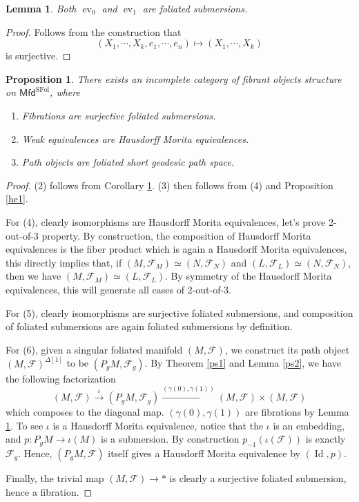 \documentclass[12pt]{amsart}
\newtheorem{lem}[thm]{Lemma}
\newtheorem{prop}[thm]{Proposition}
\theoremstyle{definition}
\theoremstyle{remark}
\numberwithin{equation}{section}
\newcommand{\CF}{{\mathcal F}}
\newcommand{\1}{{\mathbb{1}}}
\newcommand{\mfd}{\mathsf{Mfd}}
\newcommand{\sfol}{{\operatorname{SFol}}}
\newcommand{\id}{\operatorname{Id}}
\newcommand{\ev}{\operatorname{ev}}
\begin{document}
\begin{lem}\label{ps3}
    Both $\ev_0$ and $\ev_1$ are foliated submersions.
\end{lem}
\begin{proof}
    Follows from the construction that \begin{equation*}
        (X_1,\cdots, X_k, e_1,\cdots, e_n)\mapsto (X_1,\cdots, X_k)
    \end{equation*}
    is surjective.
\end{proof}

\begin{prop}
      There exists an incomplete category of fibrant objects structure on $\mfd^{\sfol}$, where
      \begin{enumerate}
          \item Fibrations are surjective foliated submersions.
          \item Weak equivalences are Hausdorff Morita equivalences.
          \item Path objects are foliated short geodesic path space.
      \end{enumerate}
\end{prop}
\begin{proof}
    (2) follows from Corollary \ref{ps3}. (3) then follows from (4) and Proposition \ref{he1}. 
    
    For (4), clearly isomorphisms are Hausdorff Morita equivalences, let's prove 2-out-of-3 property. By construction, the composition of Hausdorff Morita equivalences is the fiber product which is again a Hausdorff Morita equivalences, this directly implies that, if $(M, \CF_M)\simeq (N, \CF_N)$ and $(L, \CF_L)\simeq (N, \CF_N)$, then we have $(M, \CF_M)\simeq (L, \CF_L)$. By symmetry of the Hausdorff Morita equivalences, this will generate all cases of 2-out-of-3.
    
    For (5), clearly isomorphisms are surjective foliated submersions, and composition of foliated submersions are again foliated submersions by definition.
    
    For (6), given a singular foliated manifold $(M, \CF)$, we construct its path object $(M, \CF)^{\Delta[1]}$ to be $(P_g M, \CF_g)$. By Theorem \ref{ps1} and Lemma \ref{ps2}, we have the following factorization
    \begin{equation*}
	(M, \CF) \stackrel{\iota}{\longrightarrow} (P_g M, \CF_g) \stackrel{(\gamma(0), \gamma(1))}{\longrightarrow} 	(M, \CF) \times 	(M, \CF)
	\end{equation*}
	which composes to the diagonal map. $(\gamma(0), \gamma(1))$ are fibrations by Lemma \ref{ps3}. To see $\iota$ is a Hausdorff Morita equivalence, notice that the $\iota$ is an embedding, and $p:P_gM \to \iota(M)$ is a submersion. By construction $p_{-1}(\iota(\CF))$ is exactly $\CF_g$. Hence, $(P_gM, \CF)$ itself gives a Hausdorff Morita equivalence by $(\id, p)$.
    
    Finally, the trivial map $(M, \CF) \to *$ is clearly a surjective foliated submersion, hence a fibration.
\end{proof}
\end{document}
